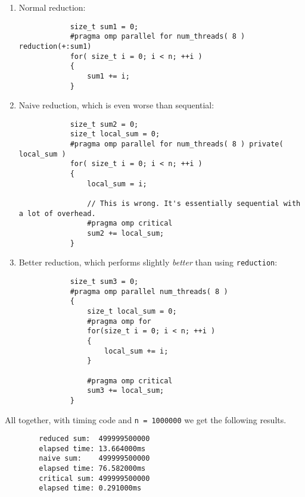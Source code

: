 \documentclass{article}
\begin{document}
    \begin{enumerate}
        \item Normal reduction: \begin{verbatim}
            size_t sum1 = 0;
            #pragma omp parallel for num_threads( 8 ) reduction(+:sum1)
            for( size_t i = 0; i < n; ++i )
            {
                sum1 += i;
            }
        \end{verbatim}

        \item Naive reduction, which is even worse than sequential: \begin{verbatim}
            size_t sum2 = 0;
            size_t local_sum = 0;
            #pragma omp parallel for num_threads( 8 ) private( local_sum )
            for( size_t i = 0; i < n; ++i )
            {
                local_sum = i;

                // This is wrong. It's essentially sequential with a lot of overhead.
                #pragma omp critical
                sum2 += local_sum;
            }
        \end{verbatim}

        \item Better reduction, which performs slightly \textit{better} than using \texttt{reduction}: \begin{verbatim}
            size_t sum3 = 0;
            #pragma omp parallel num_threads( 8 )
            {
                size_t local_sum = 0;
                #pragma omp for
                for(size_t i = 0; i < n; ++i )
                {
                    local_sum += i;
                }

                #pragma omp critical
                sum3 += local_sum;
            }
        \end{verbatim}
    \end{enumerate}

    All together, with timing code and \texttt{n = 1000000} we get the following results.

    \begin{verbatim}
        reduced sum:  499999500000
        elapsed time: 13.664000ms
        naive sum:    499999500000
        elapsed time: 76.582000ms
        critical sum: 499999500000
        elapsed time: 0.291000ms
    \end{verbatim}
\end{document}
